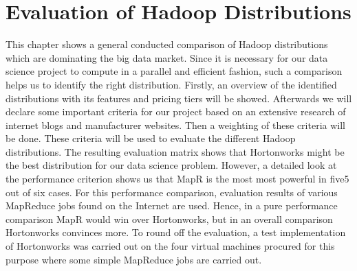 
\section{Evaluation of Hadoop Distributions}

This chapter shows a general conducted comparison of Hadoop distributions which are dominating the big
data market. Since it is necessary for our data science project to compute in a parallel and efficient fashion, such a comparison helps us to identify the right distribution. Firstly, an overview of the identified distributions with its features and pricing tiers will be showed. Afterwards we will declare some important criteria for our project based on an extensive research of internet blogs and manufacturer websites. Then a weighting of these criteria will be done. These criteria will be used to evaluate the different Hadoop distributions. The resulting evaluation matrix shows that Hortonworks might be the best distribution for our data science problem. However, a detailed look at the performance criterion shows us that MapR is the most most powerful in five5 out of six cases. For this performance comparison, evaluation results of various MapReduce jobs found on the Internet are used. Hence, in a pure performance comparison MapR would win over Hortonworks, but in an overall comparison Hortonworks convinces more. To round off the
evaluation, a test implementation of Hortonworks was carried out on the four virtual machines procured for
this purpose where some simple MapReduce jobs are carried out.
